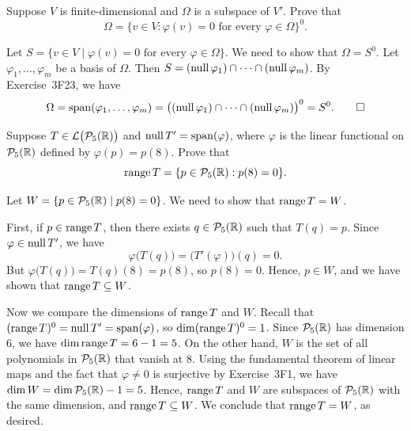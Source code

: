 \begin{exercise}
Suppose $V$ is finite-dimensional and $\Omega$ is a subspace of $V'$. Prove that
\[ \Omega = \{v\in V : \varphi(v)=0 \text{ for every } \varphi\in\Omega\}^0. \]
\end{exercise}
\begin{solution}

Let $S=\{v\in V \mid \varphi(v)=0 \text{ for every } \varphi\in\Omega\}$. We
need to show that $\Omega=S^0$. Let $\varphi_1,\dots,\varphi_m$ be a basis of
$\Omega$. Then $S=(\operatorname{null}\varphi_1)\cap\cdots\cap(\operatorname{null}\varphi_m)$. By
Exercise~3F23, we have
\[ \Omega = \operatorname{span}(\varphi_1,\dots,\varphi_m)
   = \bigl((\operatorname{null}\varphi_1)\cap\cdots\cap(\operatorname{null}\varphi_m)\bigr)^0 = S^0.
   \qedhere \]
\end{solution}

\begin{exercise}
Suppose $T\in\mathcal{L}\bigl(\mathcal{P}_5(\mathbb{R})\bigr)$ and $\operatorname{null} T'=\operatorname{span}(\varphi)$, where
$\varphi$ is the linear functional on $\mathcal{P}_5(\mathbb{R})$ defined by
$\varphi(p)=p(8)$. Prove that
\[ \operatorname{range} T = \{p\in\mathcal{P}_5(\mathbb{R}) : p(8)=0\}. \]
\end{exercise}
\begin{solution}
Let $W=\{p\in\mathcal{P}_5(\mathbb{R}) \mid p(8)=0\}$. We need to show that $\operatorname{range} T=W$.

First, if $p\in\operatorname{range} T$, then there exists $q\in\mathcal{P}_5(\mathbb{R})$ such that
$T(q)=p$. Since $\varphi\in\operatorname{null} T'$, we have
\[ \varphi\bigl(T(q)\bigr) = \bigl(T'(\varphi)\bigr)(q) = 0. \]
But $\varphi\bigl(T(q)\bigr)=T(q)(8)=p(8)$, so $p(8)=0$. Hence, $p\in W$, and
we have shown that $\operatorname{range} T\subseteq W$.

Now we compare the dimensions of $\operatorname{range} T$ and $W$. Recall that
$(\operatorname{range} T)^0=\operatorname{null} T'=\operatorname{span}(\varphi)$, so $\operatorname{dim}(\operatorname{range} T)^0=1$. Since
$\mathcal{P}_5(\mathbb{R})$ has dimension $6$, we have $\operatorname{dim}\operatorname{range} T=6-1=5$. On the other
hand, $W$ is the set of all polynomials in $\mathcal{P}_5(\mathbb{R})$ that vanish at $8$.
Using the fundamental theorem of linear maps and the fact that $\varphi\ne0$ is
surjective by Exercise~3F1, we have $\operatorname{dim} W=\operatorname{dim}\mathcal{P}_5(\mathbb{R})-1=5$. Hence,
$\operatorname{range} T$ and $W$ are subspaces of $\mathcal{P}_5(\mathbb{R})$ with the same dimension, and
$\operatorname{range} T\subseteq W$. We conclude that $\operatorname{range} T=W$, as desired.
\end{solution}

